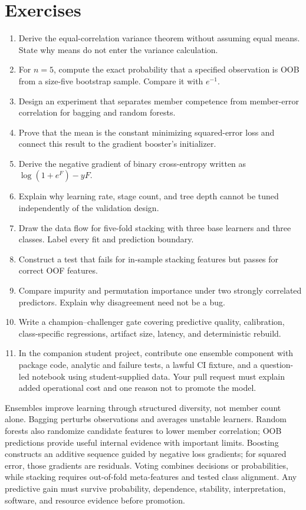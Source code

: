 \section{Exercises}
\begin{enumerate}
  \item Derive the equal-correlation variance theorem without assuming equal
  means. State why means do not enter the variance calculation.
  \item For $n=5$, compute the exact probability that a specified observation
  is OOB from a size-five bootstrap sample. Compare it with $e^{-1}$.
  \item Design an experiment that separates member competence from member-error
  correlation for bagging and random forests.
  \item Prove that the mean is the constant minimizing squared-error loss and
  connect this result to the gradient booster's initializer.
  \item Derive the negative gradient of binary cross-entropy written as
  $\log(1+e^F)-yF$.
  \item Explain why learning rate, stage count, and tree depth cannot be tuned
  independently of the validation design.
  \item Draw the data flow for five-fold stacking with three base learners and
  three classes. Label every fit and prediction boundary.
  \item Construct a test that fails for in-sample stacking features but passes
  for correct OOF features.
  \item Compare impurity and permutation importance under two strongly
  correlated predictors. Explain why disagreement need not be a bug.
  \item Write a champion--challenger gate covering predictive quality,
  calibration, class-specific regressions, artifact size, latency, and
  deterministic rebuild.
  \item In the companion student project, contribute one ensemble component
  with package code, analytic and failure tests, a lawful CI fixture, and a
  question-led notebook using student-supplied data. Your pull request must
  explain added operational cost and one reason not to promote the model.
\end{enumerate}

\begin{chapterreview}
Ensembles improve learning through structured diversity, not member count
alone. Bagging perturbs observations and averages unstable learners. Random
forests also randomize candidate features to lower member correlation; OOB
predictions provide useful internal evidence with important limits. Boosting
constructs an additive sequence guided by negative loss gradients; for squared
error, those gradients are residuals. Voting combines decisions or
probabilities, while stacking requires out-of-fold meta-features and tested
class alignment. Any predictive gain must survive probability, dependence,
stability, interpretation, software, and resource evidence before promotion.
\end{chapterreview}

